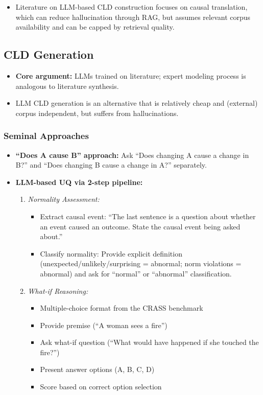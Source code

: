 \documentclass[12pt]{article}
\begin{document}
\begin{itemize}
    \item Literature on LLM-based CLD construction focuses on causal translation, which can reduce hallucination through RAG, but assumes relevant corpus availability and can be capped by retrieval quality.
\end{itemize}

\subsection{CLD Generation}

\begin{itemize}
    \item \textbf{Core argument:} LLMs trained on literature; expert modeling process is analogous to literature synthesis.
    \item LLM CLD generation is an alternative that is relatively cheap and (external) corpus independent, but suffers from hallucinations.
\end{itemize}

\subsubsection{Seminal Approaches}

\begin{itemize}
    \item \textbf{``Does A cause B'' approach:} Ask ``Does changing A cause a change in B?'' and ``Does changing B cause a change in A?'' separately.
    \item \textbf{LLM-based UQ via 2-step pipeline:}
    \begin{enumerate}
        \item \textit{Normality Assessment:}
        \begin{itemize}
            \item Extract causal event: ``The last sentence is a question about whether an event caused an outcome. State the causal event being asked about.''
            \item Classify normality: Provide explicit definition (unexpected/unlikely/surprising = abnormal; norm violations = abnormal) and ask for ``normal'' or ``abnormal'' classification.
        \end{itemize}
        \item \textit{What-if Reasoning:}
        \begin{itemize}
            \item Multiple-choice format from the CRASS benchmark
            \item Provide premise (``A woman sees a fire'')
            \item Ask what-if question (``What would have happened if she touched the fire?'')
            \item Present answer options (A, B, C, D)
            \item Score based on correct option selection
        \end{itemize}
    \end{enumerate}
\end{itemize}
\end{document}
